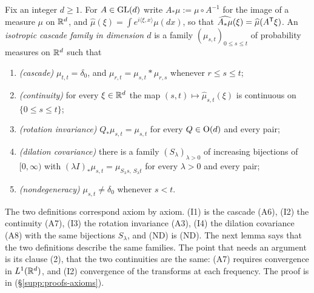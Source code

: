 \begin{definition}\label{def:isotropic-kernel-family}
Fix an integer $d \ge 1$. For $A \in \mathrm{GL}(d)$ write $A_*\mu := \mu \circ A^{-1}$ for the image of a
measure $\mu$ on $\mathbb{R}^d$, and $\widehat\mu(\xi) = \int e^{i\langle\xi,x\rangle}\mu(dx)$, so that
$\widehat{A_*\mu}(\xi) = \widehat\mu(A^{\mathsf{T}}\xi)$. An \emph{isotropic cascade family in dimension
$d$} is a family $(\mu_{s,t})_{0 \le s \le t}$ of probability measures on $\mathbb{R}^d$ such that
\begin{enumerate}
\item[(I1)] \emph{(cascade)} $\mu_{t,t} = \delta_0$, and $\mu_{r,t} = \mu_{s,t} * \mu_{r,s}$
whenever $r \le s \le t$;
\item[(I2)] \emph{(continuity)} for every $\xi \in \mathbb{R}^d$ the map
$(s,t) \mapsto \widehat\mu_{s,t}(\xi)$ is continuous on $\{0 \le s \le t\}$;
\item[(I3)] \emph{(rotation invariance)} $Q_*\mu_{s,t} = \mu_{s,t}$ for every $Q \in \mathrm{O}(d)$
and every pair;
\item[(I4)] \emph{(dilation covariance)} there is a family $(S_\lambda)_{\lambda > 0}$ of
increasing bijections of $[0,\infty)$ with $(\lambda I)_*\mu_{s,t} = \mu_{S_\lambda s,\,S_\lambda t}$
for every $\lambda > 0$ and every pair;
\item[(ND)] \emph{(nondegeneracy)} $\mu_{s,t} \ne \delta_0$ whenever $s < t$.
\end{enumerate}
\end{definition}

The two definitions correspond axiom by axiom. (I1) is the cascade (A6), (I2) the continuity (A7),
(I3) the rotation invariance (A3), (I4) the dilation covariance (A8) with the same bijections
$S_\lambda$, and (ND) is (ND). The next lemma says that the two definitions describe the same
families. The point that needs an argument is its clause (2), that the two continuities are the
same: (A7) requires convergence in $L^1(\mathbb{R}^d)$, and (I2) convergence of the transforms at
each frequency. The proof is in \suppl{} (\S\ref{supp:proofs-axioms}).

